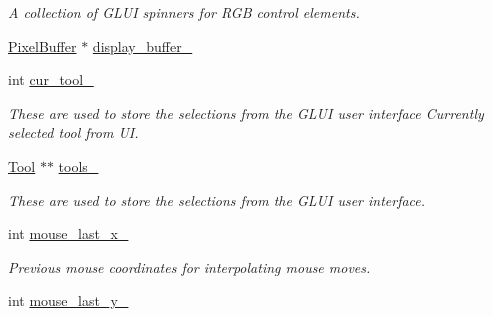 \begin{DoxyCompactItemize}
\begin{tabbing}
\end{tabbing}\begin{DoxyCompactList}\small\item\em A collection of G\+L\+UI spinners for R\+GB control elements. \end{DoxyCompactList}\item 
\hyperlink{classimage__tools_1_1PixelBuffer}{Pixel\+Buffer} $\ast$ \hyperlink{classimage__tools_1_1FlashPhotoApp_ad0a08d5606cfc5aa02412303147c612d}{display\+\_\+buffer\+\_\+}
\item 
int \hyperlink{classimage__tools_1_1FlashPhotoApp_a1aa3a6b34a072dd47f6b7ab150a52710}{cur\+\_\+tool\+\_\+}\hypertarget{classimage__tools_1_1FlashPhotoApp_a1aa3a6b34a072dd47f6b7ab150a52710}{}\label{classimage__tools_1_1FlashPhotoApp_a1aa3a6b34a072dd47f6b7ab150a52710}

\begin{DoxyCompactList}\small\item\em These are used to store the selections from the G\+L\+UI user interface Currently selected tool from UI. \end{DoxyCompactList}\item 
\hyperlink{classimage__tools_1_1Tool}{Tool} $\ast$$\ast$ \hyperlink{classimage__tools_1_1FlashPhotoApp_afbf9034065490150ebbda3b18ed997b2}{tools\+\_\+}\hypertarget{classimage__tools_1_1FlashPhotoApp_afbf9034065490150ebbda3b18ed997b2}{}\label{classimage__tools_1_1FlashPhotoApp_afbf9034065490150ebbda3b18ed997b2}

\begin{DoxyCompactList}\small\item\em These are used to store the selections from the G\+L\+UI user interface. \end{DoxyCompactList}\item 
int \hyperlink{classimage__tools_1_1FlashPhotoApp_a02008fe44be326994e7983982d5f8b58}{mouse\+\_\+last\+\_\+x\+\_\+}\hypertarget{classimage__tools_1_1FlashPhotoApp_a02008fe44be326994e7983982d5f8b58}{}\label{classimage__tools_1_1FlashPhotoApp_a02008fe44be326994e7983982d5f8b58}

\begin{DoxyCompactList}\small\item\em Previous mouse coordinates for interpolating mouse moves. \end{DoxyCompactList}\item 
int \hyperlink{classimage__tools_1_1FlashPhotoApp_abd546ebc214dea88be2768d78466711f}{mouse\+\_\+last\+\_\+y\+\_\+}\hypertarget{classimage__tools_1_1FlashPhotoApp_abd546ebc214dea88be2768d78466711f}{}\label{classimage__tools_1_1FlashPhotoApp_abd546ebc214dea88be2768d78466711f}


\end{DoxyCompactItemize}
